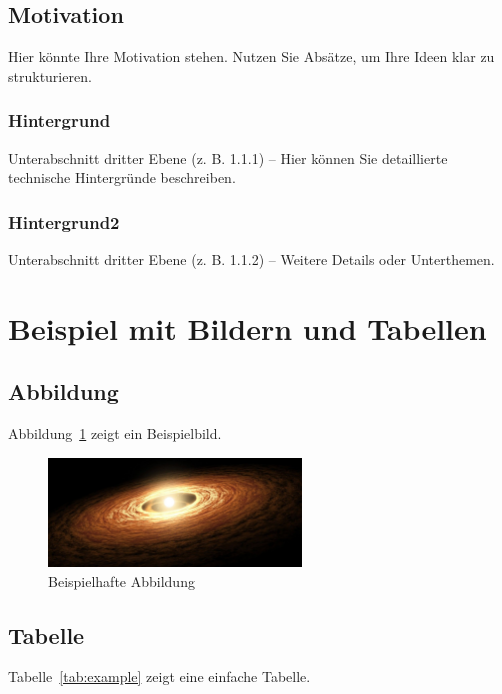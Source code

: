 \documentclass[a4paper,12pt]{article}
\begin{document}
\subsection{Motivation}
Hier könnte Ihre Motivation stehen. Nutzen Sie Absätze, um Ihre Ideen klar zu strukturieren.

\subsubsection{Hintergrund}
Unterabschnitt dritter Ebene (z. B. 1.1.1) – Hier können Sie detaillierte technische Hintergründe beschreiben.

\subsubsection{Hintergrund2}
Unterabschnitt dritter Ebene (z. B. 1.1.2) – Weitere Details oder Unterthemen.

\section{Beispiel mit Bildern und Tabellen}

\subsection{Abbildung}
Abbildung~\ref{fig:example} zeigt ein Beispielbild.

\begin{figure}[h!]
    \centering
    \includegraphics[width=0.6\textwidth]{universe} %
    \caption{Beispielhafte Abbildung}
    \label{fig:example}
\end{figure}

\subsection{Tabelle}
Tabelle~\ref{tab:example} zeigt eine einfache Tabelle.
\end{document}
